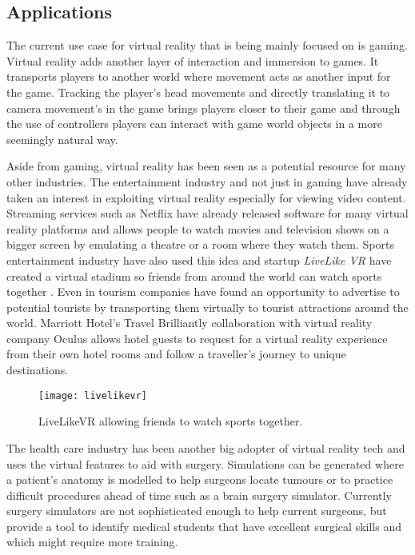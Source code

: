 \subsection{Applications}
The current use case for virtual reality that is being mainly focused on is gaming. Virtual reality adds another layer of interaction and immersion to games. It transports players to another world where movement acts as another input for the game. Tracking the player's head movements and directly translating it to camera movement's in the game brings players closer to their game and through the use of controllers players can interact with game world objects in a more seemingly natural way.
\newline
\par
Aside from gaming, virtual reality has been seen as a potential resource for many other industries. The entertainment industry and not just in gaming have already taken an interest in exploiting virtual reality especially for viewing video content. Streaming services such as Netflix have already released software for many virtual reality platforms and allows people to watch movies and television shows on a bigger screen by emulating a theatre or a room where they watch them\cite{netflixvr}. Sports entertainment industry have also used this idea and startup \textit{LiveLike VR} have created a virtual stadium so friends from around the world can watch sports together \cite{livelike}. Even in tourism companies have found an opportunity to advertise to potential tourists by transporting them virtually to tourist attractions around the world. Marriott Hotel's Travel Brilliantly\cite{marriottVR} collaboration with virtual reality company Oculus allows hotel guests to request for a virtual reality experience from their own hotel rooms and follow a traveller's journey to unique destinations.
\clearpage
\begin{figure}[ht]
	\texttt{[image: livelikevr]}
	\centering
	\caption{LiveLikeVR allowing friends to watch sports together. \cite{livelikeimage}}
	\label{fig:stereoscope1}
\end{figure}
The health care industry has been another big adopter of virtual reality tech and uses the virtual features to aid with surgery. Simulations can be generated where a patient's anatomy is modelled to help surgeons locate tumours or to practice difficult procedures ahead of time such as a brain surgery simulator\cite{brainsim}. Currently surgery simulators are not sophisticated enough to help current surgeons, but provide a tool to identify medical students that have excellent surgical skills and which might require more training.
